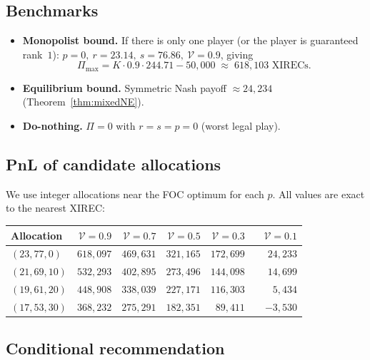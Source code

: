 \documentclass[11pt,a4paper]{article}
\theoremstyle{definition}
\theoremstyle{remark}
\newcommand{\Sp}{\mathcal{V}}
\begin{document}
\subsection{Benchmarks}
\begin{itemize}[leftmargin=*,itemsep=2pt]
  \item \textbf{Monopolist bound.} If there is only one player (or the player is
  guaranteed rank~\(1\)): \(p=0,\ r=23.14,\ s=76.86,\ \Sp=0.9\), giving
  \[
  \Pi_{\max}= K\cdot 0.9\cdot 244.71-50{,}000\;\approx\;\boxed{618{,}103\text{ XIRECs}}.
  \]
  \item \textbf{Equilibrium bound.} Symmetric Nash payoff
  \(\approx 24{,}234\) (Theorem~\ref{thm:mixedNE}).
  \item \textbf{Do-nothing.} \(\Pi=0\) with \(r=s=p=0\) (worst legal play).
\end{itemize}

\subsection{PnL of candidate allocations}

We use integer allocations near the FOC optimum for each \(p\). All values are
exact to the nearest XIREC:

\begin{center}
\renewcommand{\arraystretch}{1.10}
\begin{tabular}{l r r r r r}
\toprule
Allocation & \(\Sp=0.9\) & \(\Sp=0.7\) & \(\Sp=0.5\) & \(\Sp=0.3\) & \(\Sp=0.1\) \\
\midrule
\((23,77,0)\)  & \(618{,}097\) & \(469{,}631\) & \(321{,}165\) & \(172{,}699\) & \(\phantom{-0}24{,}233\) \\
\((21,69,10)\) & \(532{,}293\) & \(402{,}895\) & \(273{,}496\) & \(144{,}098\) & \(\phantom{-0}14{,}699\) \\
\((19,61,20)\) & \(448{,}908\) & \(338{,}039\) & \(227{,}171\) & \(116{,}303\) & \(\phantom{-00}5{,}434\) \\
\((17,53,30)\) & \(368{,}232\) & \(275{,}291\) & \(182{,}351\) & \(\phantom{0}89{,}411\) & \(-3{,}530\) \\
\bottomrule
\end{tabular}
\end{center}

\subsection{Conditional recommendation}
\end{document}
